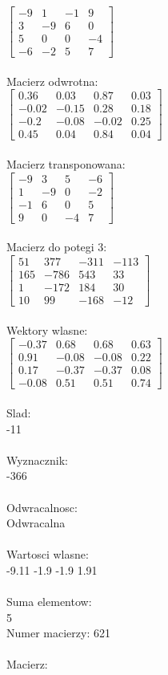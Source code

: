 \documentclass[a4paper,12pt]{article}
\begin{document}
$\begin{bmatrix} -9&1&-1&9\\3&-9&6&0\\5&0&0&-4\\-6&-2&5&7 \end{bmatrix}$
\\
\\
Macierz odwrotna:\\

$\begin{bmatrix} 0.36&0.03&0.87&0.03\\-0.02&-0.15&0.28&0.18\\-0.2&-0.08&-0.02&0.25\\0.45&0.04&0.84&0.04 \end{bmatrix}$
\\
\\
Macierz transponowana:\\

$\begin{bmatrix} -9&3&5&-6\\1&-9&0&-2\\-1&6&0&5\\9&0&-4&7 \end{bmatrix}$
\\
\\
Macierz do potegi 3:\\

$\begin{bmatrix} 51&377&-311&-113\\165&-786&543&33\\1&-172&184&30\\10&99&-168&-12 \end{bmatrix}$
\\
\\
Wektory wlasne:\\

$\begin{bmatrix} -0.37&0.68&0.68&0.63\\0.91&-0.08&-0.08&0.22\\0.17&-0.37&-0.37&0.08\\-0.08&0.51&0.51&0.74 \end{bmatrix}$
\\
\\
Slad:\\
-11
\\
\\
Wyznacznik:\\
-366
\\
\\
Odwracalnosc:\\
Odwracalna
\\
\\
Wartosci wlasne:\\
-9.11 -1.9 -1.9 1.91
\\
\\
Suma elementow:\\
5
\\
\newpage
Numer macierzy:
621
\\
\\
Macierz:\\
\end{document}
